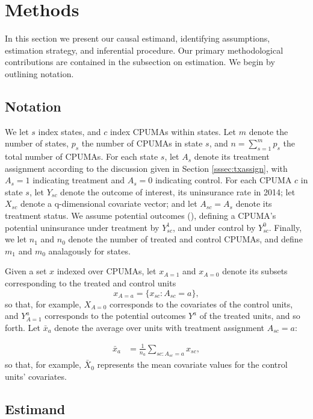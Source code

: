 \documentclass[aoas]{imsart}
\theoremstyle{plain}
\theoremstyle{remark}
\begin{document}
\section{Methods}\label{sec:methods}

In this section we present our causal estimand, identifying assumptions, estimation strategy, and inferential procedure. Our primary methodological contributions are contained in the subsection on estimation. We begin by outlining notation.

\subsection{Notation}
We let $s$ index states, and $c$ index CPUMAs within states. Let $m$ denote the number of states, $p_s$  the number of CPUMAs in state $s$, and $n = \sum_{s=1}^m p_s$ the total number of CPUMAs. For each state $s$, let $A_s$ denote its treatment assignment according to the discussion given in Section \ref{sssec:txassign}, with $A_s = 1$ indicating treatment and $A_s=0$ indicating control. For each CPUMA $c$ in state $s$, let $Y_{sc}$ denote the outcome of interest, its uninsurance rate in 2014; let $X_{sc}$ denote a q-dimensional covariate vector; and let $A_{sc} = A_{s}$ denote its treatment status. We assume potential outcomes (\cite{rubin2005causal}), defining a CPUMA's potential uninsurance under treatment by $Y^1_{sc}$, and under control by $Y^0_{sc}$. Finally, we let $n_1$ and $n_0$ denote the number of treated and control CPUMAs, and define $m_1$ and $m_0$ analagously for states.

Given a set $x$ indexed over CPUMAs, let $x_{A=1}$ and $x_{A=0}$ denote its subsets corresponding to the treated and control units
\[ x_{A=a} = \{x_{sc}: A_{sc}=a\},\]
so that, for example, $X_{A=0}$ corresponds to the covariates of the control units, and $Y_{A=1}^a$ corresponds to the potential outcomes $Y^a$ of the treated units, and so forth. Let $\bar{x}_a$ denote the average over units with treatment assignment $A_{sc} = a$:

\begin{align*}
	\bar{x}_a & = \frac{1}{n_a} \sum_{sc: A_{sc}=a} x_{sc},
\end{align*}
so that, for example, $\bar{X}_0$ represents the mean covariate values for the control units' covariates. 

\subsection{Estimand} \label{ssec:estimand}
\end{document}
